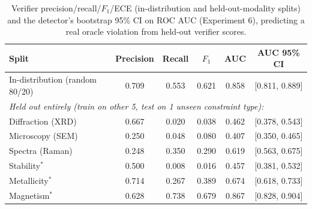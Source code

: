 \documentclass[pdflatex,sn-nature]{sn-jnl}
\begin{document}
\begin{table}[t]
\centering
\caption{Verifier precision/recall/$F_1$/ECE (in-distribution and held-out-modality
splits) and the detector's bootstrap 95\% CI on ROC AUC (Experiment 6), predicting a
real oracle violation from held-out verifier scores.}
\label{tab:verifier}
{\scriptsize\setlength{\tabcolsep}{4pt}
\begin{tabular}{lccccc}
\toprule
Split & Precision & Recall & $F_1$ & AUC & AUC 95\% CI \\
\midrule
In-distribution (random 80/20)   & 0.709 & 0.553 & 0.621 & 0.858 & [0.811, 0.889] \\
\midrule
\multicolumn{6}{l}{\textit{Held out entirely (train on other 5, test on 1 unseen constraint type):}} \\
Diffraction (XRD)      & 0.667 & 0.020 & 0.038 & 0.462 & [0.378, 0.543] \\
Microscopy (SEM)       & 0.250 & 0.048 & 0.080 & 0.407 & [0.350, 0.465] \\
Spectra (Raman)        & 0.248 & 0.350 & 0.290 & 0.619 & [0.563, 0.675] \\
Stability$^{*}$        & 0.500 & 0.008 & 0.016 & 0.457 & [0.381, 0.532] \\
Metallicity$^{*}$      & 0.714 & 0.267 & 0.389 & 0.674 & [0.618, 0.733] \\
Magnetism$^{*}$        & 0.628 & 0.738 & 0.679 & 0.867 & [0.828, 0.904] \\
\bottomrule
\end{tabular}}
\end{table}

\end{document}
